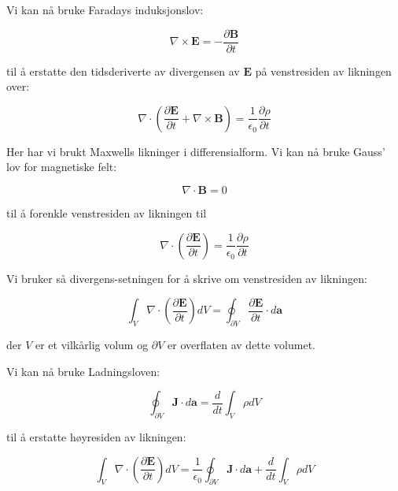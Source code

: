 Vi kan nå bruke Faradays induksjonslov:

\begin{equation*}
\nabla \times \mathbf{E} = -\frac{\partial \mathbf{B}}{\partial t}
\end{equation*}

til å erstatte den tidsderiverte av divergensen av $\mathbf{E}$ på venstresiden av likningen over:

\begin{equation*}
\nabla \cdot (\frac{\partial \mathbf{E}}{\partial t} + \nabla \times \mathbf{B}) = \frac{1}{\epsilon_0}\frac{\partial \rho}{\partial t}
\end{equation*}

Her har vi brukt Maxwells likninger i differensialform. Vi kan nå bruke Gauss' lov for magnetiske felt:

\begin{equation*}
\nabla \cdot \mathbf{B} = 0
\end{equation*}

til å forenkle venstresiden av likningen til

\begin{equation*}
\nabla \cdot (\frac{\partial \mathbf{E}}{\partial t}) = \frac{1}{\epsilon_0}\frac{\partial \rho}{\partial t}
\end{equation*}

Vi bruker så divergens-setningen for å skrive om venstresiden av likningen:

\begin{equation*}
\int_V \nabla \cdot (\frac{\partial \mathbf{E}}{\partial t}) dV = \oint_{\partial V} \frac{\partial \mathbf{E}}{\partial t} \cdot d\mathbf{a}
\end{equation*}

der $V$ er et vilkårlig volum og $\partial V$ er overflaten av dette volumet.

Vi kan nå bruke Ladningsloven:

\begin{equation*}
\oint_{\partial V} \mathbf{J} \cdot d\mathbf{a} = \frac{d}{dt} \int_V \rho dV
\end{equation*}

til å erstatte høyresiden av likningen:

\begin{equation*}
\int_V \nabla \cdot (\frac{\partial \mathbf{E}}{\partial t}) dV = \frac{1}{\epsilon_0} \oint_{\partial V} \mathbf{J} \cdot d\mathbf{a} + \frac{d}{dt} \int_V \rho dV
\end{equation*}

